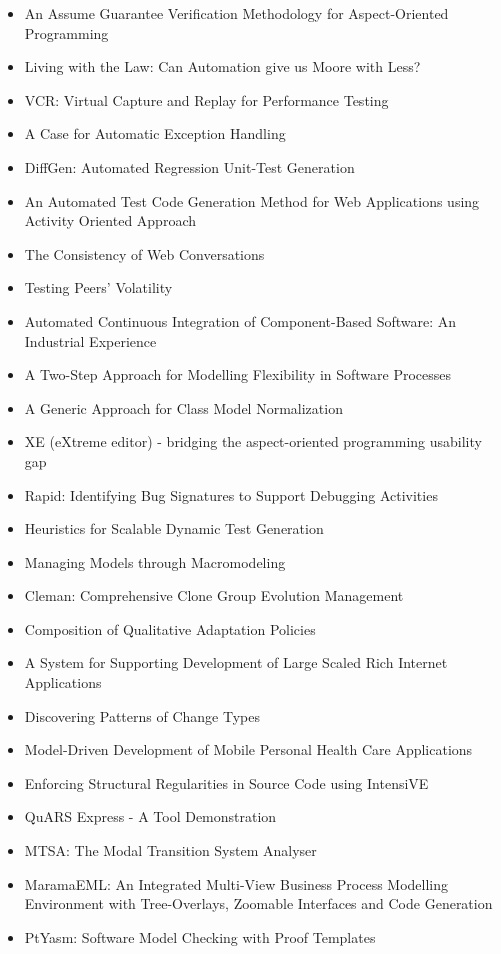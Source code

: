 {\begin{itemize}[itemsep=-1ex]
  \item An Assume Guarantee Verification Methodology for Aspect-Oriented Programming
  \item Living with the Law: Can Automation give us Moore with Less?
  \item VCR: Virtual Capture and Replay for Performance Testing
  \item A Case for Automatic Exception Handling
  \item DiffGen: Automated Regression Unit-Test Generation
  \item An Automated Test Code Generation Method for Web Applications using Activity Oriented Approach
  \item The Consistency of Web Conversations
  \item Testing Peers' Volatility
  \item Automated Continuous Integration of Component-Based Software: An Industrial Experience
  \item A Two-Step Approach for Modelling Flexibility in Software Processes
  \item A Generic Approach for Class Model Normalization
  \item XE (eXtreme editor) - bridging the aspect-oriented programming usability gap
  \item Rapid: Identifying Bug Signatures to Support Debugging Activities
  \item Heuristics for Scalable Dynamic Test Generation
  \item Managing Models through Macromodeling
  \item Cleman: Comprehensive Clone Group Evolution Management
  \item Composition of Qualitative Adaptation Policies
  \item A System for Supporting Development of Large Scaled Rich Internet Applications
  \item Discovering Patterns of Change Types
  \item Model-Driven Development of Mobile Personal Health Care Applications
  \item Enforcing Structural Regularities in Source Code using IntensiVE
  \item QuARS Express - A Tool Demonstration
  \item MTSA: The Modal Transition System Analyser
  \item MaramaEML: An Integrated Multi-View Business Process Modelling Environment with Tree-Overlays, Zoomable Interfaces and Code Generation
  \item PtYasm: Software Model Checking with Proof Templates

\end{itemize}}
